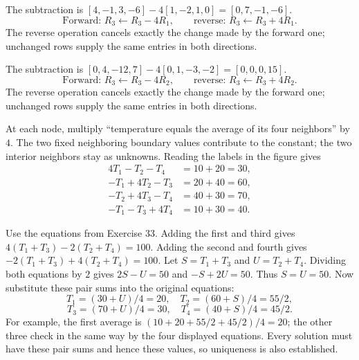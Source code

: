 The subtraction is $[4,-1,3,-6]-4[1,-2,1,0]=[0,7,-1,-6]$.
\[\text{Forward: }R_3\leftarrow R_3-4R_1,\qquad\text{reverse: }R_3\leftarrow R_3+4R_1.\]
The reverse operation cancels exactly the change made by the forward one; unchanged rows supply the same entries in both directions.

The subtraction is $[0,4,-12,7]-4[0,1,-3,-2]=[0,0,0,15]$.
\[\text{Forward: }R_3\leftarrow R_3-4R_2,\qquad\text{reverse: }R_3\leftarrow R_3+4R_2.\]
The reverse operation cancels exactly the change made by the forward one; unchanged rows supply the same entries in both directions.

At each node, multiply ``temperature equals the average of its four
neighbors'' by $4$. The two fixed neighboring boundary values contribute
to the constant; the two interior neighbors stay as unknowns. Reading the
labels in the figure gives
\[
\begin{aligned}
4T_1-T_2-T_4&=10+20=30,\\
-T_1+4T_2-T_3&=20+40=60,\\
-T_2+4T_3-T_4&=40+30=70,\\
-T_1-T_3+4T_4&=10+30=40.
\end{aligned}
\]

Use the equations from Exercise 33. Adding the first and third gives
$4(T_1+T_3)-2(T_2+T_4)=100$. Adding the second and fourth gives
$-2(T_1+T_3)+4(T_2+T_4)=100$.
Let $S=T_1+T_3$ and $U=T_2+T_4$. Dividing both equations by $2$
gives $2S-U=50$ and $-S+2U=50$. Thus $S=U=50$.
Now substitute these pair sums into the original equations:
\[
T_1=(30+U)/4=20,\quad T_2=(60+S)/4=55/2,
\]
\[
T_3=(70+U)/4=30,\quad T_4=(40+S)/4=45/2.
\]
For example, the first average is $(10+20+55/2+45/2)/4=20$;
the other three check in the same way by the four displayed equations.
Every solution must have these pair sums and hence these values, so
uniqueness is also established.
